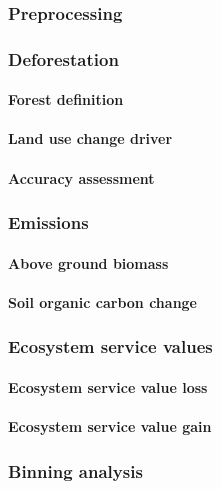 \subsubsection{Preprocessing}
\subsubsection{Deforestation}
\paragraph{Forest definition}
\paragraph{Land use change driver}
\paragraph{Accuracy assessment}
\subsubsection{Emissions}
\paragraph{Above ground biomass}
\paragraph{Soil organic carbon change}
\subsubsection{Ecosystem service values}
\paragraph{Ecosystem service value loss}
\paragraph{Ecosystem service value gain}
\subsubsection{Binning analysis}